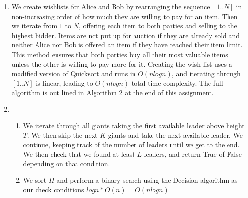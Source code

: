 \documentclass[a4paper]{article}
\begin{document}
\begin{enumerate}
\begin{enumerate}
\begin{proof}
\begin{align*}
						&= \left(\begin{smallmatrix}F_{k+1}&F_{k}\\ F_{k}&F_{k-1}\end{smallmatrix}\right) \left(\begin{smallmatrix}1&1\\1&0\end{smallmatrix}\right) \\
						&= \left(\begin{smallmatrix}F_{k+1} + F_{k} &F_{k}+F_{k-1}\\ F_{k} + F_{k-1} &F_{k}\end{smallmatrix}\right) \\
						&= \left(\begin{smallmatrix}F_{k+2}&F_{k+1}\\ F_{k+1}&F_{k}\end{smallmatrix}\right) \\
						&= \left(\begin{smallmatrix}F_{n+1}&F_{n}\\ F_{n}&F_{n-1}\end{smallmatrix}\right) 
				\end{align*}
\end{proof}


								\item At most $2logn$ multiplications are needed, give a time complexity of $O(logn)$. The procedure is outlined as Algorithm 1 at the end of this assignment.
									
\end{enumerate}
\item We create wishlists for Alice and Bob by rearranging the sequence $[1..N]$ in non-increasing order of how much they are willing to pay for an item. Then we iterate from $1$ to $N$, offering each item to both parties and selling to the highest bidder. Items are not put up for auction if they are already sold and neither Alice nor Bob is offered an item if they have reached their item limit. This method ensures that both parties buy all their most valuable items unless the other is willing to pay more for it. Creating the wish list uses a modified version of Quicksort and runs in $O(nlogn)$, and iterating through $[1..N]$ is linear, leading to $O(nlogn)$ total time complexity. The full algorithm is out lined in Algorithm 2 at the end of this assignment.
		\item \begin{enumerate}
				\item We iterate through all giants taking the first available leader above height $T$. We then skip the next $K$ giants and take the next available leader. We continue, keeping track of the number of leaders until we get to the end. We then check that we found at least $L$ leaders, and return True of False depending on that condition.
				\item We sort $H$ and perform a binary search using the Decision algorithm as our check conditions $logn*O(n)=O(nlogn)$
						

\end{enumerate}
        
\end{enumerate}
\end{document}
